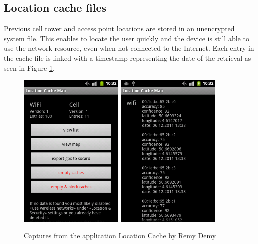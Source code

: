 \subsection{Location cache files}
\label{sec:loc-cache-files}

Previous cell tower and access point locations are stored in an unencrypted system file.
This enables to locate the user quickly and the device is still able to use the network resource, even when not connected to the Internet.
Each entry in the cache file is linked with a timestamp representing the date of the retrieval as seen in Figure \ref{fig:locmap}.\\

\begin{figure}[h]
  \centering
  \includegraphics[width=5cm]{images/cache1.png}
  \includegraphics[width=5cm]{images/cache2.png}
  \caption{Captures from the application Location Cache by Remy Demy}
  \label{fig:locmap}
\end{figure}

